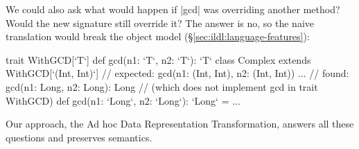 We could also ask what would happen if |gcd| was overriding another method? Would the new signature still override it? The answer is no, so the naive translation would break the object model (\S\ref{sec:ildl:language-features}):

\begin{lstlisting-nobreak}
trait WithGCD[`T`] {
  def gcd(n1: `T`, n2: `T`): `T`
}
class Complex extends WithGCD[`(Int, Int)`] {
  // expected: gcd(n1: (Int, Int), n2: (Int, Int)) ...
  // found:    gcd(n1: Long, n2: Long): Long
  // (which does not implement gcd in trait WithGCD)
  def gcd(n1: `Long`, n2: `Long`): `Long` = ...
}
\end{lstlisting-nobreak}

Our approach, the Ad hoc Data Representation Transformation, answers all these questions and preserves semantics. %

